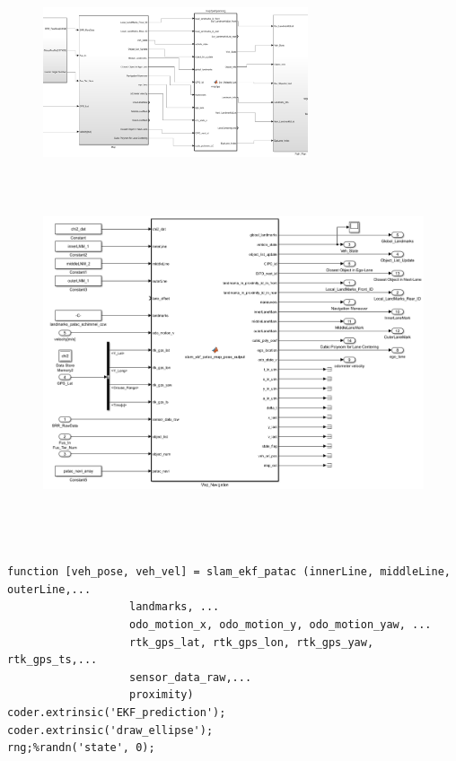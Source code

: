 \documentclass[12pt,a4paper]{article}
\newcommand{\zhiv}{\fontsize{12pt}{18pt}\selectfont}      %
\begin{document}
{{{\begin{figure}[!htb]
  \centering
  \includegraphics[height=125pt]{model_main.jpg}
\end{figure}

\begin{figure}[!htb]
  \centering
  \includegraphics[height=300pt]{model_mapping.jpg}
\end{figure}


{\subsection{\textbf{\song\zhiv{主控模型 m函数}}}}

\begin{verbatim}
function [veh_pose, veh_vel] = slam_ekf_patac (innerLine, middleLine, outerLine,...
                   landmarks, ...
                   odo_motion_x, odo_motion_y, odo_motion_yaw, ...
                   rtk_gps_lat, rtk_gps_lon, rtk_gps_yaw, rtk_gps_ts,...
                   sensor_data_raw,...
                   proximity)
coder.extrinsic('EKF_prediction');    
coder.extrinsic('draw_ellipse');    
rng;%randn('state', 0);


\end{verbatim}}}}
\end{document}

